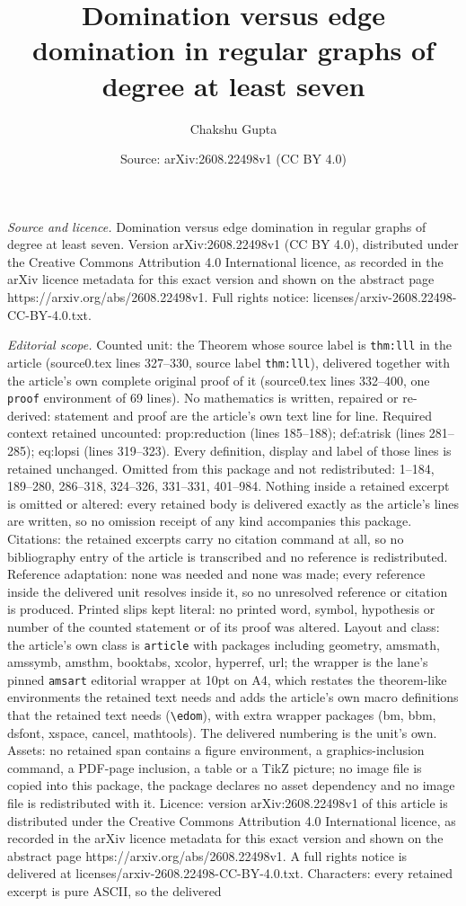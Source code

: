 \documentclass[10pt,a4paper]{amsart}
\title[Domination versus edge domination in regular graphs of degre]{Domination versus edge domination in regular graphs of degree at least seven}
\author{Chakshu Gupta}
\date{Source: arXiv:2608.22498v1 (CC BY 4.0)}
\begin{document}
\maketitle

\noindent\emph{Source and licence.} Domination versus edge domination in regular graphs of degree at least seven. Version arXiv:2608.22498v1 (CC BY 4.0), distributed under the Creative Commons Attribution 4.0 International licence, as recorded in the arXiv licence metadata for this exact version and shown on the abstract page https://arxiv.org/abs/2608.22498v1. Full rights notice: licenses/arxiv-2608.22498-CC-BY-4.0.txt.\par\smallskip

\noindent\textit{Editorial scope.} Counted unit: the Theorem whose source label is \texttt{thm:lll} in the article (source0.tex lines 327--330, source label \texttt{thm:lll}), delivered together with the article's own complete original proof of it (source0.tex lines 332--400, one \texttt{proof} environment of 69 lines). No mathematics is written, repaired or re-derived: statement and proof are the article's own text line for line. Required context retained uncounted: prop:reduction (lines 185--188); def:atrisk (lines 281--285); eq:lopsi (lines 319--323). Every definition, display and label of those lines is retained unchanged. Omitted from this package and not redistributed: 1--184, 189--280, 286--318, 324--326, 331--331, 401--984. Nothing inside a retained excerpt is omitted or altered: every retained body is delivered exactly as the article's lines are written, so no omission receipt of any kind accompanies this package. Citations: the retained excerpts carry no citation command at all, so no bibliography entry of the article is transcribed and no reference is redistributed. Reference adaptation: none was needed and none was made; every reference inside the delivered unit resolves inside it, so no unresolved reference or citation is produced. Printed slips kept literal: no printed word, symbol, hypothesis or number of the counted statement or of its proof was altered. Layout and class: the article's own class is \texttt{article} with packages including geometry, amsmath, amssymb, amsthm, booktabs, xcolor, hyperref, url; the wrapper is the lane's pinned \texttt{amsart} editorial wrapper at 10pt on A4, which restates the theorem-like environments the retained text needs and adds the article's own macro definitions that the retained text needs (\texttt{\textbackslash edom}), with extra wrapper packages (bm, bbm, dsfont, xspace, cancel, mathtools). The delivered numbering is the unit's own. Assets: no retained span contains a figure environment, a graphics-inclusion command, a PDF-page inclusion, a table or a TikZ picture; no image file is copied into this package, the package declares no asset dependency and no image file is redistributed with it. Licence: version arXiv:2608.22498v1 of this article is distributed under the Creative Commons Attribution 4.0 International licence, as recorded in the arXiv licence metadata for this exact version and shown on the abstract page https://arxiv.org/abs/2608.22498v1. A full rights notice is delivered at licenses/arxiv-2608.22498-CC-BY-4.0.txt. Characters: every retained excerpt is pure ASCII, so the delivered 
\end{document}
